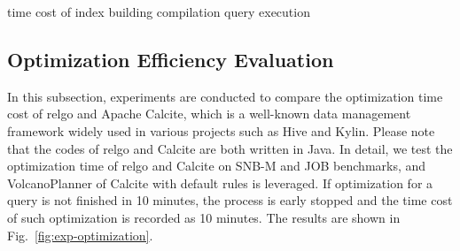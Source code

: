 time cost of index building
compilation
query execution

\subsection{Optimization Efficiency Evaluation}
\label{sec:experiment-optimize}

In this subsection, experiments are conducted to compare the optimization time cost of relgo and Apache Calcite, which is a well-known data management framework widely used in various projects such as Hive and Kylin.
Please note that the codes of relgo and Calcite are both written in Java.
In detail, we test the optimization time of relgo and Calcite on SNB-M and JOB benchmarks, and VolcanoPlanner of Calcite with default rules is leveraged.
If optimization for a query is not finished in 10 minutes, the process is early stopped and the time cost of such optimization is recorded as 10 minutes.
The results are shown in Fig.~\ref{fig:exp-optimization}.

